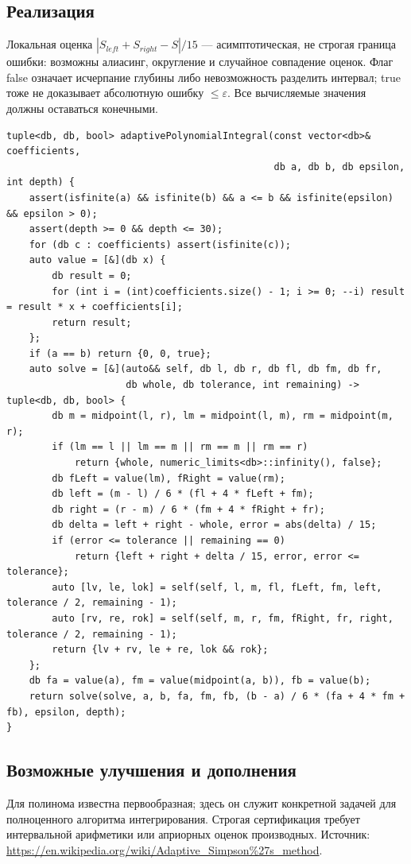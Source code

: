 \subsection*{Реализация}
Локальная оценка $|S_{left}+S_{right}-S|/15$ --- асимптотическая, не строгая
граница ошибки: возможны алиасинг, округление и случайное совпадение оценок.
Флаг false означает исчерпание глубины либо невозможность разделить интервал;
true тоже не доказывает абсолютную ошибку $\le\varepsilon$.
Все вычисляемые значения должны оставаться конечными.
\begin{lstlisting}[name=optimization_simpson]
tuple<db, db, bool> adaptivePolynomialIntegral(const vector<db>& coefficients,
                                               db a, db b, db epsilon, int depth) {
    assert(isfinite(a) && isfinite(b) && a <= b && isfinite(epsilon) && epsilon > 0);
    assert(depth >= 0 && depth <= 30);
    for (db c : coefficients) assert(isfinite(c));
    auto value = [&](db x) {
        db result = 0;
        for (int i = (int)coefficients.size() - 1; i >= 0; --i) result = result * x + coefficients[i];
        return result;
    };
    if (a == b) return {0, 0, true};
    auto solve = [&](auto&& self, db l, db r, db fl, db fm, db fr,
                     db whole, db tolerance, int remaining) -> tuple<db, db, bool> {
        db m = midpoint(l, r), lm = midpoint(l, m), rm = midpoint(m, r);
        if (lm == l || lm == m || rm == m || rm == r)
            return {whole, numeric_limits<db>::infinity(), false};
        db fLeft = value(lm), fRight = value(rm);
        db left = (m - l) / 6 * (fl + 4 * fLeft + fm);
        db right = (r - m) / 6 * (fm + 4 * fRight + fr);
        db delta = left + right - whole, error = abs(delta) / 15;
        if (error <= tolerance || remaining == 0)
            return {left + right + delta / 15, error, error <= tolerance};
        auto [lv, le, lok] = self(self, l, m, fl, fLeft, fm, left, tolerance / 2, remaining - 1);
        auto [rv, re, rok] = self(self, m, r, fm, fRight, fr, right, tolerance / 2, remaining - 1);
        return {lv + rv, le + re, lok && rok};
    };
    db fa = value(a), fm = value(midpoint(a, b)), fb = value(b);
    return solve(solve, a, b, fa, fm, fb, (b - a) / 6 * (fa + 4 * fm + fb), epsilon, depth);
}
\end{lstlisting}
\subsection*{Возможные улучшения и дополнения}
Для полинома известна первообразная; здесь он служит конкретной задачей
для полноценного алгоритма интегрирования. Строгая сертификация требует
интервальной арифметики или априорных оценок производных.
Источник: \url{https://en.wikipedia.org/wiki/Adaptive_Simpson%27s_method}.


